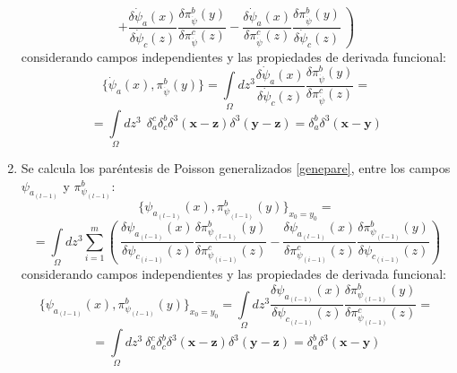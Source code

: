 \documentclass[a4paper,12pt]{article}
\begin{document}
\begin{enumerate}
$$\left.+\frac{\delta \dot\psi_a(x)}{\delta \dot\psi_{c}(z)}\frac{\delta \pi^{b}_{\dot\psi}(y)}{\delta \pi^{c}_{\dot\psi}(z) }-\frac{\delta \dot\psi_a(x)}{\delta \pi^{c}_{\dot\psi}(z) }\frac{\delta \pi^{b}_{\dot\psi}(y)}{\delta \dot\psi_{c}(z) }\ \right)$$
considerando campos independientes y las propiedades de derivada funcional:
\begin{equation}
\{\dot\psi_a(x),\pi^{b}_{\dot\psi}(y)\}=\int\limits_{\Omega}dz^3\frac{\delta \dot\psi_a(x)}{\delta \dot\psi_{c}(z)}\frac{\delta \pi^{b}_{\dot\psi}(y)}{\delta \pi^{c}_{\dot\psi}(z) } =
\end{equation}
$$=\int\limits_{\Omega}dz^3\ \ \delta_{a}^{c}\delta_{c}^{b}\delta^3(\textbf{x}-\textbf{z})\delta^3(\textbf{y}-\textbf{z})=\delta_{a}^{b}\delta^3(\textbf{x}-\textbf{y})$$
\item[\fbox{3.}] Se calcula los paréntesis de Poisson generalizados \eqref{genepare}, entre los campos $\psi_{a_{(l-1)}}$ y $\pi^{b}_{\psi_{(l-1)}}$:
\begin{equation}
\{\psi_{a_{(l-1)}}(x),\pi^{b}_{\psi_{(l-1)}}(y)\}_{x_0=y_0}= 
\end{equation}
$$=\int\limits_{\Omega}dz^3\sum\limits_{i=1}^{m}\left(\ \frac{\delta \psi_{a_{(l-1)}}(x)}{\delta\psi_{c_{(i-1)}}(z)}\frac{\delta\pi^{b}_{\psi_{(l-1)}}(y)}{\delta \pi^{c}_{\psi_{(i-1)}}(z) }-\frac{\delta \psi_{a_{(l-1)}}(x)}{\delta \pi^{c}_{\psi_{(i-1)}}(z)}\frac{\delta \pi^{b}_{\psi_{(l-1)}}(y)}{\delta\psi_{c_{(i-1)}}(z)}\right)$$
considerando campos independientes y las propiedades de derivada funcional:
\begin{equation}
\{\psi_{a_{(l-1)}}(x),\pi^{b}_{\psi_{(l-1)}}(y)\}_{x_0=y_0}=\int\limits_{\Omega}dz^3 \frac{\delta \psi_{a_{(l-1)}}(x)}{\delta\psi_{c_{(l-1)}}(z)}\frac{\delta\pi^{b}_{\psi_{(l-1)}}(y)}{\delta \pi^{c}_{\psi_{(l-1)}}(z) }= 
\end{equation}
$$=\int\limits_{\Omega}dz^3\  \delta_{a}^{c}\delta_{c}^{b}\delta^3(\textbf{x}-\textbf{z})\delta^3(\textbf{y}-\textbf{z})=\delta_{a}^{b}\delta^3(\textbf{x}-\textbf{y})$$
\end{enumerate}
\vspace{0,4cm}

\\
\end{document}
